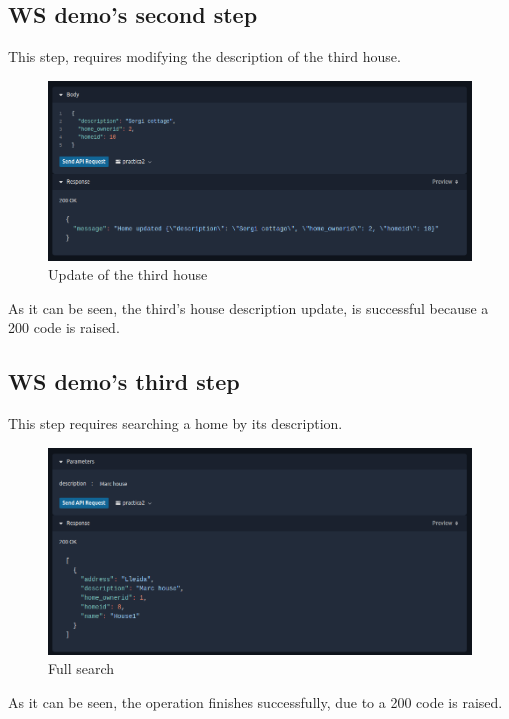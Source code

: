 \documentclass[a4paper,12pt]{article}
\begin{document}
\subsection*{WS demo's second step}
This step, requires modifying the description of the third house.
\begin{figure}[H]
    \centering
    \includegraphics[scale = 0.5]{images/House 3 update.png}
    \caption{Update of the third house}
    \label{fig:house3U}
\end{figure}
As it can be seen, the third's house description update, is successful because a 200 code is raised.
\subsection*{WS demo's third step}
This step requires searching a home by its description.
\begin{figure}[H]
    \centering
    \includegraphics[scale = 0.5]{images/Full search.png}
    \caption{Full search}
    \label{fig:full}
\end{figure}
As it can be seen, the operation finishes successfully, due to a 200 code is raised.
\newpage
\end{document}

